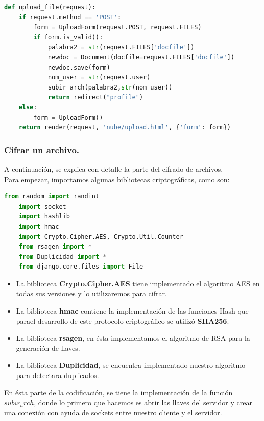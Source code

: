 \begin{lstlisting}[language=Python,frame=single, keywordstyle=\color{blue},breaklines=true]
def upload_file(request):
    if request.method == 'POST':
        form = UploadForm(request.POST, request.FILES)
        if form.is_valid():
            palabra2 = str(request.FILES['docfile'])
            newdoc = Document(docfile=request.FILES['docfile'])
            newdoc.save(form)
            nom_user = str(request.user)
            subir_arch(palabra2,str(nom_user))
            return redirect("profile")
    else:
        form = UploadForm()
    return render(request, 'nube/upload.html', {'form': form})

\end{lstlisting}

\subsubsection{Cifrar un archivo.} 
A continuación, se explica con detalle la parte del cifrado de archivos. \\
Para empezar, importamos algunas bibliotecas criptográficas, como son:

\begin{lstlisting}[language=Python,frame=single, keywordstyle=\color{blue},breaklines=true]
	from random import randint
	import socket
	import hashlib
	import hmac
	import Crypto.Cipher.AES, Crypto.Util.Counter
	from rsagen import *
	from Duplicidad import *
	from django.core.files import File
\end{lstlisting}


\begin{itemize}
	\item  La biblioteca \textbf{Crypto.Cipher.AES} tiene implementado el algoritmo AES en todas sus versiones y lo utilizaremos para cifrar.
	\item  La biblioteca \textbf{hmac} contiene la implementación de las funciones Hash que parael desarrollo de este protocolo criptográfico se utilizó \textbf{SHA256}.
	\item La biblioteca \textbf{rsagen}, en ésta implementamos el algoritmo de RSA para la generación de llaves.
	\item La biblioteca \textbf{Duplicidad}, se encuentra implementado nuestro algoritmo para detectara duplicados.

\end{itemize}



En ésta parte de la codificación, se tiene la implementación de la función \textbf{\textit{$subir_arch$}}, donde lo primero que hacemos es abrir las llaves del servidor y crear una conexión con ayuda de sockets entre nuestro cliente y el servidor.
		
